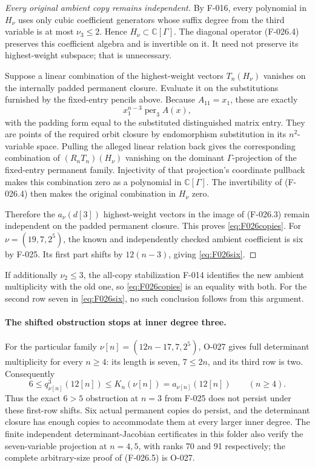 \begin{proof}[Every original ambient copy remains independent]
By F-016, every polynomial in \(H_\nu\) uses only cubic
coefficient generators whose suffix degree from the third
variable is at most \(\nu_3\leq2\). Hence
\(H_\nu\subset\mathbb C[\Gamma]\). The diagonal
operator (F-026.4) preserves this coefficient algebra and
is invertible on it. It need not preserve its highest-weight
subspace; that is unnecessary.

Suppose a linear combination of the highest-weight vectors
\(T_n(H_\nu)\) vanishes on the internally padded permanent
closure. Evaluate it on the substitutions furnished by the
fixed-entry pencils above. Because \(A_{11}=x_1\), these
are exactly
\[
                         x_1^{n-3}\operatorname{per}_3 A(x),
\]
with the padding form equal to the substituted distinguished
matrix entry. They are points of the required orbit closure
by endomorphism substitution in its \(n^2\)-variable space.
Pulling the alleged linear relation back gives the
corresponding combination of \((R_nT_n)(H_\nu)\)
vanishing on the dominant \(\Gamma\)-projection of the
fixed-entry permanent family. Injectivity of that projection's
coordinate pullback makes this combination zero as a polynomial
in \(\mathbb C[\Gamma]\). The invertibility of (F-026.4)
then makes the original combination in \(H_\nu\) zero.

Therefore the \(a_\nu(d[3])\) highest-weight vectors in
the image of (F-026.3) remain independent on the padded
permanent closure. This proves \eqref{eq:F026copies}.
For \(\nu=(19,7,2^5)\), the known and independently
checked ambient coefficient is six by F-025. Its first
part shifts by \(12(n-3)\), giving \eqref{eq:F026six}.
\end{proof}

If additionally \(\nu_2\leq3\), the all-copy stabilization
F-014 identifies the new ambient multiplicity with the old
one, so \eqref{eq:F026copies} is an equality with both.
For the second row seven in \eqref{eq:F026six}, no such
conclusion follows from this argument.

\paragraph{The shifted obstruction stops at inner degree three.}
For the particular family \(\nu[n]=(12n-17,7,2^5)\),
O-027 gives full determinant multiplicity for every \(n\geq4\):
its length is seven, \(7\leq2n\), and its third row is two.
Consequently
\[
       6\leq q^3_{\nu[n]}(12[n])
                 \leq K_n(\nu[n])=a_{\nu[n]}(12[n])
                           \qquad(n\geq4).
                                                               \tag{F-026.5}
\]
Thus the exact \(6>5\) obstruction at \(n=3\) from F-025
does not persist under these first-row shifts. Six actual
permanent copies do persist, and the determinant closure
has enough copies to accommodate them at every larger
inner degree. The finite independent determinant-Jacobian
certificates in this folder also verify the seven-variable
projection at \(n=4,5\), with ranks 70 and 91 respectively;
the complete arbitrary-size proof of (F-026.5) is O-027.

